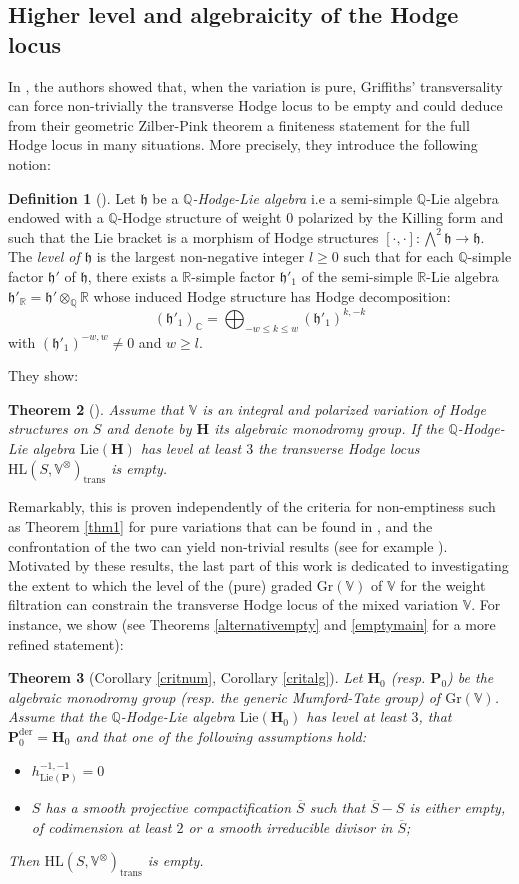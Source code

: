 \documentclass[10pt]{article}
\numberwithin{equation}{subsection}
\theoremstyle{plain}
\newtheorem{theorem}{Theorem}[section]
\theoremstyle{definition}
\newtheorem{definition}[theorem]{Definition}
\theoremstyle{remark}
\newcommand{\lie}{\mathrm{Lie}}
\newcommand{\Q}{\mathbb Q}
\newcommand{\C}{\mathbb C}
\newcommand{\R}{\mathbb R}
\newcommand{\V}{\mathbb V}
\newcommand{\pp}{\mathbf P}
\newcommand{\mon}{\mathbf H}
\newcommand{\HL}{\mathrm{HL}(S, \V^\otimes)}
\newcommand{\gr}{\mathrm{Gr}}
\newcommand{\ort}{\mathfrak{h}}
\newcommand{\der}{\mathrm{der}}
\newcommand{\trans}{\mathrm{trans}}
\begin{document}
\subsection*{Higher level and algebraicity of the Hodge locus}
In \cite{bku}, the authors showed that, when the variation is pure, Griffiths' transversality can force non-trivially the transverse Hodge locus to be empty and could deduce from their geometric Zilber-Pink theorem a finiteness statement for the full Hodge locus in many situations. More precisely, they introduce the following notion:
\begin{definition}[{\cite[Def. 4.9, Def. 4.13]{bku}}]
Let $\ort$ be a \textit{$\Q$-Hodge-Lie algebra} i.e a semi-simple $\Q$-Lie algebra endowed with a $\Q$-Hodge structure of weight $0$ polarized by the Killing form and such that the Lie bracket is a morphism of Hodge structures $[\cdot,\cdot] : \bigwedge^2 \ort \rightarrow \ort$. The \textit{level of $\ort$} is the largest non-negative integer $l \geqslant 0$ such that for each $\Q$-simple factor $\ort'$ of $\ort$, there exists a $\R$-simple factor $\ort'_1$ of the semi-simple $\R$-Lie algebra $\ort'_\R = \ort' \otimes_\Q \R$ whose induced Hodge structure has Hodge decomposition:
\[
(\ort'_1)_\C = \bigoplus_{-w \leqslant k \leqslant w} (\ort'_1)^{k, -k}
\]
with $(\ort'_1)^{-w, w} \neq 0$ and $w \geqslant l$.
\end{definition}
They show:
\begin{theorem}[{\cite[Thm. 3.3]{bku}}]
Assume that $\V$ is an integral and polarized variation of Hodge structures on $S$ and denote by $\mon$ its algebraic monodromy group. If the $\Q$-Hodge-Lie algebra $\lie(\mon)$ has level at least $3$ the transverse Hodge locus $\HL_\trans$ is empty.
\end{theorem}
Remarkably, this is proven independently of the criteria for non-emptiness such as Theorem \ref{thm1} for pure variations that can be found in \cite{es,ku}, and the confrontation of the two can yield non-trivial results (see for example \cite{kbounds}). Motivated by these results, the last part of this work is dedicated to investigating the extent to which the level of the (pure) graded $\gr(\V)$ of $\V$ for the weight filtration can constrain the transverse Hodge locus of the mixed variation $\V$. For instance, we show (see Theorems \ref{alternativempty} and \ref{emptymain} for a more refined statement):
\begin{theorem}[Corollary \ref{critnum}, Corollary \ref{critalg}]\label{thm3}
Let $\mon_0$ (resp. $\pp_0$) be the algebraic monodromy group (resp. the generic Mumford-Tate group) of $\gr(\V)$. Assume that the $\Q$-Hodge-Lie algebra $\lie(\mon_0)$ has level at least $3$, that $\pp_0^\der = \mon_0$ and that one of the following assumptions hold:
\begin{itemize}
\item[(1)] $h^{-1,-1}_{\lie(\pp)} = 0$
\item[(2)] $S$ has a smooth projective compactification $\overline{S}$ such that $\overline{S}-S$ is either empty, of codimension at least $2$ or a smooth irreducible divisor in $\overline{S}$;
\end{itemize}
Then $\HL_\trans$ is empty.
\end{theorem}
\end{document}
